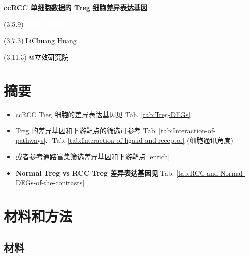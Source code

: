 \documentclass[
]{article}
\author{}
\date{\vspace{-2.5em}}
\begin{document}
\begin{titlepage} 
\begin{center} \textbf{\Huge ccRCC 单细胞数据的
Treg 细胞差异表达基因} \vspace{4em}
\begin{textblock}{10}(3,5.9) \huge
\textbf{\textcolor{white}{2023-12-06}}
\end{textblock} \begin{textblock}{10}(3,7.3)
\Large \textcolor{black}{LiChuang Huang}
\end{textblock} \begin{textblock}{10}(3,11.3)
\Large \textcolor{black}{@立效研究院}
\end{textblock} \end{center} \end{titlepage}
\restoregeometry


\tableofcontents

\listoffigures

\listoftables

\newpage


\hypertarget{abstract}{%
\section{摘要}\label{abstract}}

\begin{itemize}
\item
  ccRCC Treg 细胞的差异表达基因见 Tab. \ref{tab:Treg-DEGs}
\item
  Treg 的差异基因和下游靶点的筛选可参考 Tab. \ref{tab:Interaction-of-pathways}、Tab. \ref{tab:Interaction-of-ligand-and-receptor} (细胞通讯角度)
\item
  或者参考通路富集筛选差异基因和下游靶点 \ref{enrich}
\item
  \textbf{Normal Treg vs RCC Treg 差异表达基因见} Tab. \ref{tab:RCC-and-Normal-DEGs-of-the-contrasts}
\end{itemize}

\hypertarget{methods}{%
\section{材料和方法}\label{methods}}

\hypertarget{ux6750ux6599}{%
\subsection{材料}\label{ux6750ux6599}}
\end{document}
